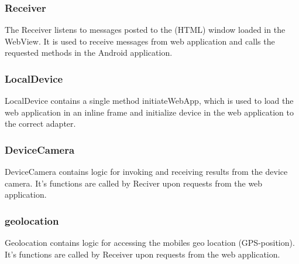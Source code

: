 \subsubsection{Receiver}
The Receiver listens to messages posted to the (HTML) window loaded in the WebView. It is used to receive messages from web application and calls the requested methods in the Android application.
\subsubsection{LocalDevice}
LocalDevice contains a single method initiateWebApp, which is used to load the web application in an inline frame and initialize device in the web application to the correct adapter.
\subsubsection{DeviceCamera}
DeviceCamera contains logic for invoking and receiving results from the device camera. It's functions are called by Reciver upon requests from the web application.
\subsubsection{geolocation}
Geolocation contains logic for accessing the mobiles geo location (GPS-position). It's functions are called by Receiver upon requests from the web application.

